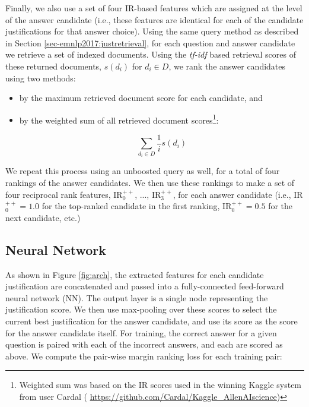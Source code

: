 {} 
Finally, we also use a set of four IR-based features which are assigned at the level of the answer candidate (i.e., these features are identical for each of the candidate justifications for that answer choice).   
Using the same query method as described in Section \ref{sec-emnlp2017:justretrieval}, for each question and answer candidate we retrieve a set of indexed documents.
Using the \emph{tf-idf} based retrieval scores of these returned documents, 
$s(d_i)$ for $d_i \in D$, we rank the answer candidates using two methods: 
\begin{itemize}
\item by the maximum retrieved document score for each candidate, and  
\item by the weighted sum of all retrieved document scores\footnote{Weighted sum was based on the IR scores used in the winning Kaggle system from user Cardal (\scriptsize{ \url{https://github.com/Cardal/Kaggle_AllenAIscience}})}:

\begin{equation}
\sum_{d_i \in D} \dfrac{1}{i} s(d_i) 
\end{equation}

\end{itemize}
We repeat this process using an unboosted query as well, for a total of four rankings of the answer candidates.  
We then use these rankings to make a set of four reciprocal rank features,  IR$^{++}_0$, ..., IR$^{++}_3$, for each answer candidate (i.e., IR$^{++}_0 = 1.0$ for the top-ranked candidate in the first ranking,  IR$^{++}_0 = 0.5$ for the next candidate, etc.)
  


\subsection{Neural Network}
\label{sec-emnlp2017:nn_model}

As shown in Figure \ref{fig:arch}, the extracted features for each candidate justification are concatenated and passed into a fully-connected feed-forward neural network (NN).  The output layer is a single node representing the justification score.  We then use max-pooling over these scores to select the current best justification for the answer candidate, and use its score as the score for the answer candidate itself.  For training, the correct answer for a given question is paired with each of the incorrect answers, and each are scored as above.  We compute the pair-wise margin ranking loss for each training pair:

